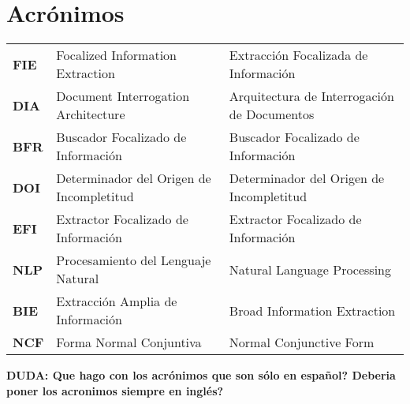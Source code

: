 \chapter*{Acrónimos}

\newcommand{\TERM}[3]{
	\textbf{#1} & #3 & #2 \\[5pt]
}

\begin{longtable}{p{1in}p{2.2in}p{3in}}

		\TERM{FIE}{Extracción Focalizada de Información}{Focalized Information Extraction}
		\TERM{DIA}{Arquitectura de Interrogación de Documentos}{Document Interrogation Architecture}
		\TERM{BFR}{Buscador Focalizado de Información}{Buscador Focalizado de Información}
		\TERM{DOI}{Determinador del Origen de Incompletitud}{Determinador del Origen de Incompletitud}		
		\TERM{EFI}{Extractor Focalizado de Información}{Extractor Focalizado de Información}
		\TERM{NLP}{Natural Language Processing}{Procesamiento del Lenguaje Natural}				
		\TERM{BIE}{Broad Information Extraction}{Extracción Amplia de Información}				
		\TERM{NCF}{Normal Conjunctive Form}{Forma Normal Conjuntiva}		

\end{longtable}

		\textbf{DUDA: Que hago con los acrónimos que son sólo en español? Deberia poner los acronimos siempre en inglés?}
		
\newpage
